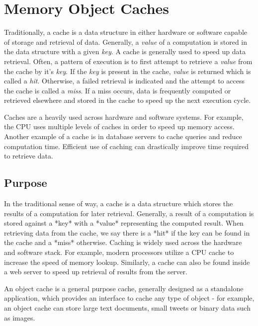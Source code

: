 \section{Memory Object Caches}

Traditionally, a cache is a data structure in either hardware or software capable of storage and retrieval of data. Generally, a \textit{value} of a computation is stored in the data structure with a given \textit{key}. A cache is generally used to speed up data retrieval. Often, a pattern of execution is to first attempt to retrieve a \textit{value} from the cache by it's \textit{key}. If the \textit{key} is present in the cache, \textit{value} is returned which is called a \textit{hit}. Otherwise, a failed retrieval is indicated and the attempt to access the cache is called a \textit{miss}. If a miss occurs, data is frequently computed or retrieved elsewhere and stored in the cache to speed up the next execution cycle.

Caches are a heavily used across hardware and software systems. For example, the CPU uses multiple levels of caches in order to speed up memory access. Another example of a cache is in database servers to cache queries and reduce computation time. Efficient use of caching can drastically improve time required to retrieve data.

\subsection{Purpose}






In the traditional sense of way, a cache is a data structure which stores the results of a computation for later retrieval. Generally, a result of a computation is stored against a *key* with a *value* representing the computed result. When retrieving data from the cache, we say there is a *hit* if the key can be found in the cache and a *miss* otherwise. Caching is widely used across the hardware and software stack. For example, modern processors utilize a CPU cache to increase the speed of memory lookup. Similarly, a cache can also be found inside a web server to speed up retrieval of results from the server.

An object cache is a general purpose cache, generally designed as a standalone application, which provides an interface to cache any type of object - for example, an object cache can store large text documents, small tweets or binary data such as images.

